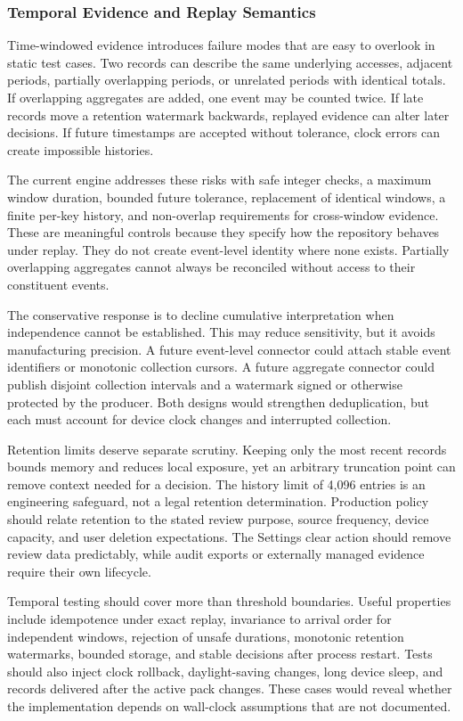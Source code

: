 \subsubsection{Temporal Evidence and Replay Semantics}

Time-windowed evidence introduces failure modes that are easy to overlook in static test cases. Two records can describe the same underlying accesses, adjacent periods, partially overlapping periods, or unrelated periods with identical totals. If overlapping aggregates are added, one event may be counted twice. If late records move a retention watermark backwards, replayed evidence can alter later decisions. If future timestamps are accepted without tolerance, clock errors can create impossible histories.

The current engine addresses these risks with safe integer checks, a maximum window duration, bounded future tolerance, replacement of identical windows, a finite per-key history, and non-overlap requirements for cross-window evidence. These are meaningful controls because they specify how the repository behaves under replay. They do not create event-level identity where none exists. Partially overlapping aggregates cannot always be reconciled without access to their constituent events.

The conservative response is to decline cumulative interpretation when independence cannot be established. This may reduce sensitivity, but it avoids manufacturing precision. A future event-level connector could attach stable event identifiers or monotonic collection cursors. A future aggregate connector could publish disjoint collection intervals and a watermark signed or otherwise protected by the producer. Both designs would strengthen deduplication, but each must account for device clock changes and interrupted collection.

Retention limits deserve separate scrutiny. Keeping only the most recent records bounds memory and reduces local exposure, yet an arbitrary truncation point can remove context needed for a decision. The history limit of 4,096 entries is an engineering safeguard, not a legal retention determination. Production policy should relate retention to the stated review purpose, source frequency, device capacity, and user deletion expectations. The Settings clear action should remove review data predictably, while audit exports or externally managed evidence require their own lifecycle.

Temporal testing should cover more than threshold boundaries. Useful properties include idempotence under exact replay, invariance to arrival order for independent windows, rejection of unsafe durations, monotonic retention watermarks, bounded storage, and stable decisions after process restart. Tests should also inject clock rollback, daylight-saving changes, long device sleep, and records delivered after the active pack changes. These cases would reveal whether the implementation depends on wall-clock assumptions that are not documented.

